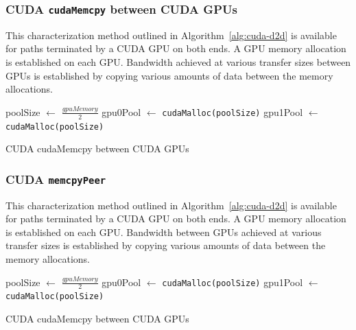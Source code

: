 \subsubsection{CUDA \texttt{cudaMemcpy} between CUDA GPUs}

This characterization method outlined in Algorithm~\ref{alg:cuda-d2d} is available for paths terminated by a CUDA GPU on both ends.
A GPU memory allocation is established on each GPU.
Bandwidth achieved at various transfer sizes between GPUs is established by copying various amounts of data between the memory allocations.

\begin{algorithm}[ht]
    \SetAlgoLined
    poolSize $\gets$ $\frac{gpuMemory}{2}$\;
    gpu0Pool $\gets$ \texttt{cudaMalloc(poolSize)}\;
    gpu1Pool $\gets$ \texttt{cudaMalloc(poolSize)}\;
    \caption{CUDA cudaMemcpy between CUDA GPUs}
    \label{alg:cuda-d2d}
\end{algorithm}

\subsubsection{CUDA \texttt{memcpyPeer}}

This characterization method outlined in Algorithm~\ref{alg:cuda-d2d} is available for paths terminated by a CUDA GPU on both ends.
A GPU memory allocation is established on each GPU.
Bandwidth between GPUs achieved at various transfer sizes is established by copying various amounts of data between the memory allocations.

\begin{algorithm}[ht]
    \SetAlgoLined
    poolSize $\gets$ $\frac{gpuMemory}{2}$\;
    gpu0Pool $\gets$ \texttt{cudaMalloc(poolSize)}\;
    gpu1Pool $\gets$ \texttt{cudaMalloc(poolSize)}\;
    \caption{CUDA cudaMemcpy between CUDA GPUs}
    \label{alg:cuda-p2p}
\end{algorithm}

